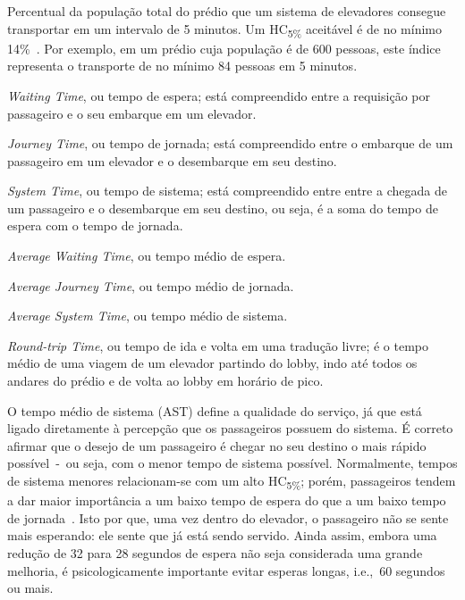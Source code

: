 \begin{description}[leftmargin=!,labelwidth=\widthof{\bfseries HC\textsubscript{5\%}}]
  \item[HC\textsubscript{5\%}]
  Percentual da população total do prédio que um sistema de elevadores consegue
  transportar em um intervalo de 5 minutos. Um HC\textsubscript{5\%} aceitável é
   de no mínimo 14\%~\cite{KOEHLEROTTIGER02}. Por exemplo, em um prédio cuja
   população é de 600 pessoas, este índice representa o transporte de no mínimo
   84 pessoas em 5 minutos.

  \item[WT]
  \textit{Waiting Time}, ou tempo de espera; está compreendido entre a
  requisição por passageiro e o seu embarque em um elevador.

  \item[JT]
  \textit{Journey Time}, ou tempo de jornada; está compreendido entre o embarque
   de um passageiro em um elevador e o desembarque em seu destino.

  \item[ST]
  \textit{System Time}, ou tempo de sistema; está compreendido entre entre a
  chegada de um passageiro e o desembarque em seu destino, ou seja, é a soma do
  tempo de espera com o tempo de jornada.

  \item[AWT]
  \textit{Average Waiting Time}, ou tempo médio de espera.

  \item[AJT]
  \textit{Average Journey Time}, ou tempo médio de jornada.

  \item[AST]
  \textit{Average System Time}, ou tempo médio de sistema.

  \item[RTT]
  \textit{Round-trip Time}, ou tempo de ida e volta em uma tradução livre; é o
  tempo médio de uma viagem de um elevador partindo do lobby, indo até todos os
  andares do prédio e de volta ao lobby em horário de pico.
\end{description}

O tempo médio de sistema (AST) define a qualidade do serviço, já que está ligado
diretamente à percepção que os passageiros possuem do sistema. É correto afirmar
que o desejo de um passageiro é chegar no seu destino o mais rápido
possível~-~ou seja, com o menor tempo de sistema possível. Normalmente, tempos
de sistema menores relacionam-se com um alto HC\textsubscript{5\%}; porém,
passageiros tendem a dar maior importância a um baixo tempo de espera do que a
um baixo tempo de jornada~\cite{KOEHLEROTTIGER02}. Isto por que, uma vez dentro
do elevador, o passageiro não se sente mais esperando: ele sente que já está
sendo servido. Ainda assim, embora uma redução de 32 para 28 segundos de espera
não seja considerada uma grande melhoria, é psicologicamente importante evitar
esperas longas, i.e.,~60 segundos ou mais.

